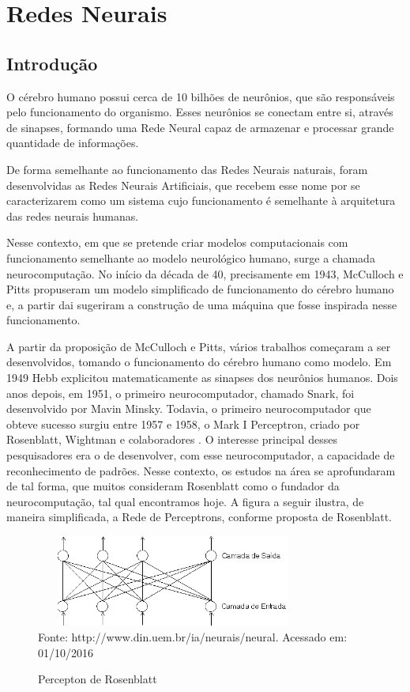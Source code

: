 \pagebreak

\section{Redes Neurais}

\subsection{Introdução}

O cérebro humano possui cerca de 10 bilhões de neurônios, que são responsáveis pelo funcionamento do organismo. 
Esses neurônios se conectam entre si, através de sinapses, formando uma Rede Neural capaz de armazenar e processar grande quantidade de informações.

De forma semelhante ao funcionamento das Redes Neurais naturais, foram desenvolvidas as Redes Neurais Artificiais, que recebem esse nome por se caracterizarem como um 
sistema cujo funcionamento é semelhante à arquitetura das redes neurais humanas.

Nesse contexto, em que se pretende criar modelos computacionais com funcionamento semelhante ao modelo neurológico humano, surge a chamada neurocomputação. 
No início da década de 40, precisamente em 1943, McCulloch e Pitts \cite{Heaton2008} propuseram um modelo simplificado de funcionamento do cérebro humano e, 
a partir dai sugeriram a construção de uma máquina que fosse inspirada nesse funcionamento.

A partir da proposição de McCulloch e Pitts, vários trabalhos começaram a ser desenvolvidos, tomando o funcionamento do cérebro humano como modelo. 
Em 1949 Hebb explicitou matematicamente as sinapses dos neurônios humanos. Dois anos depois, em 1951, o primeiro neurocomputador, 
chamado Snark, foi desenvolvido por Mavin Minsky. Todavia, o primeiro neurocomputador que obteve sucesso surgiu entre 1957 e 1958, 
o Mark I Perceptron, criado por Rosenblatt, Wightman e colaboradores \cite{Heaton2008}. O interesse principal desses pesquisadores era o de desenvolver, com esse neurocomputador, a capacidade de reconhecimento de padrões. Nesse contexto, os estudos na área se aprofundaram de tal forma, que muitos consideram Rosenblatt como o fundador da neurocomputação, tal qual encontramos hoje. 
A figura a seguir ilustra, de maneira simplificada, a Rede de Perceptrons, conforme proposta de Rosenblatt.

\begin{figure}[!ht]
\centering
\caption{Percepton de Rosenblatt}
\vspace{1mm}
\includegraphics[width=90mm, height=30mm]{Figuras/Neural/Rosenblatt.png}\\
\tiny Fonte: http://www.din.uem.br/ia/neurais/neural. Acessado em: 01/10/2016
\end{figure}



